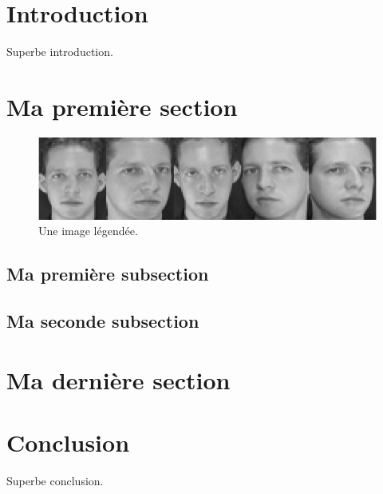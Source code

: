 \documentclass[12pt, openany]{article}
\begin{document}


\newpage
\tableofcontents

\section{Introduction}

Superbe introduction.
\lipsum[1-2]

\section{Ma première section}

\begin{figure}[!h]
  \centering
  \includegraphics[scale=1]{images/eximages.png}
  \caption{Une image légendée.}
  \label{fig:eximage}
\end{figure}

\lipsum[2]

\subsection{Ma première subsection}
\lipsum[1]

\subsection{Ma seconde subsection}
\lipsum[1]

\section{Ma dernière section}
\lipsum[1]

\section{Conclusion}

Superbe conclusion.
\lipsum[2]

\newpage
\listoffigures

\nocite{*}%


\end{document}
